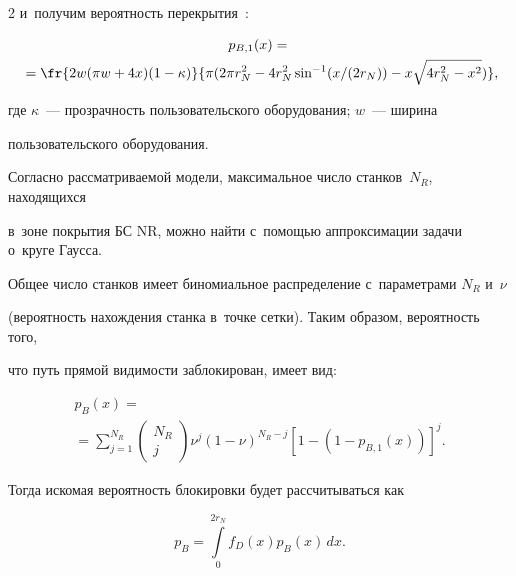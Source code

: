 \begin{multicols}{2}
и~получим вероятность перекрытия~\cite{santalo2004integral}:


\begin{multline*}




p_{B,1}(x)={}\\


{}=\fr{2w(\pi{}w+4x) (1-\kappa)}{\pi(2\pi{}r_N^2-4r_N^2\sin^{-1}(x/(2r_N))-


x\sqrt{4r_N^2-x^2})},


\end{multline*}


где $\kappa$~--- прозрачность пользовательского оборудования; $w$~--- ширина 


пользовательского оборудования.


Согласно рассматриваемой модели, максимальное чис\-ло станков~$N_R$, находящихся 


в~зоне покрытия БС NR, можно найти с~по\-мощью аппроксимации задачи о~круге Гаусса.





Общее число станков имеет биномиальное распределение с~параметрами $N_R$ и~$\nu$ 


(вероятность нахождения станка в~точке сетки). Таким образом, вероятность того, 


что путь прямой видимости заблокирован, имеет вид:


\begin{multline*}


p_{B}(x)={}\\


\!{}=\sum\limits_{j=1}^{N_R}\!\begin{pmatrix}


N_R\\ j\end{pmatrix} 


\nu^{j}(1-\nu)^{N_R-j}


\left[1-(1-p_{B,1}(x))\right]^j\!. \!




\end{multline*}


%


Тогда искомая вероятность блокировки будет рассчитываться как


\begin{equation*}




p_{B}=\int\limits_{0}^{2r_N}f_{D}(x)p_{B}(x)\,dx.



\end{equation*}
\end{multicols}
